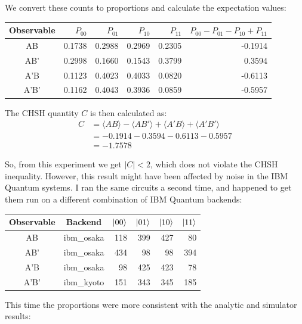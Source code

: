 \documentclass[12pt]{extarticle}
\begin{document}
\begin{enumerate}[(a)]
We convert these counts to proportions and calculate the expectation values:

\begin{center}
\begin{tabular}{|c|r|r|r|r|r|}
\hline
Observable & $P_{00}$ & $P_{01}$ & $P_{10}$ & $P_{11}$ & $P_{00} - P_{01} - P_{10} + P_{11}$ \\
\hline
AB   & 0.1738 & 0.2988 & 0.2969 & 0.2305 & -0.1914 \\
AB'  & 0.2998 & 0.1660 & 0.1543 & 0.3799 &  0.3594 \\
A'B  & 0.1123 & 0.4023 & 0.4033 & 0.0820 & -0.6113 \\
A'B' & 0.1162 & 0.4043 & 0.3936 & 0.0859 & -0.5957 \\
\hline
\end{tabular}
\end{center}

The CHSH quantity $C$ is then calculated as:
\begin{align*}
C & = \langle AB \rangle - \langle AB' \rangle + \langle A'B \rangle + \langle A'B' \rangle \\
& = -0.1914 - 0.3594 - 0.6113 - 0.5957 \\
& = -1.7578
\end{align*}

So, from this experiment we get $|C|<2$, which does not violate the CHSH inequality.
However, this result might have been affected by noise in the IBM Quantum systems.
I ran the same circuits a second time, and happened to get them run on a different combination of IBM Quantum backends:

\begin{center}
\begin{tabular}{|c|c|r|r|r|r|}
\hline
Observable & Backend & $\ket{00}$ & $\ket{01}$ & $\ket{10}$ & $\ket{11}$  \\
\hline
AB   & ibm\_osaka & 118 & 399 & 427 &  80 \\
AB'  & ibm\_osaka & 434 &  98 &  98 & 394 \\
A'B  & ibm\_osaka &  98 & 425 & 423 &  78 \\
A'B' & ibm\_kyoto & 151 & 343 & 345 & 185 \\
\hline
\end{tabular}
\end{center}

This time the proportions were more consistent with the analytic and simulator results:


\end{enumerate}
\end{document}

